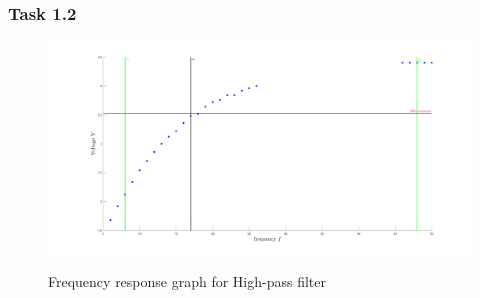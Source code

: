 \documentclass{article}
\begin{document}
\subsubsection{Task 1.2}
\begin{figure}[!ht]
  \caption{Frequency response graph for High-pass filter}
  \includegraphics[width=\textwidth]{HPF.png}
  \label{fig:task-1-2}
\end{figure}
\end{document}
